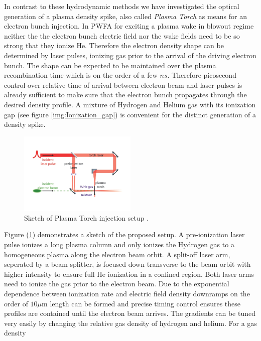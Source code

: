 In contrast to these hydrodynamic methods we have investigated the optical generation of a plasma density spike, also called \textit{Plasma Torch} \cite{PlaTo,PlaTo2} as means for an electron bunch injection.
In PWFA for exciting a plasma wake in blowout regime neither the the electron bunch electric field nor the wake fields need to be so strong that they ionize He. Therefore the electron density shape can be determined by laser pulses, ionizing gas prior to the arrival of the driving electron bunch. The shape can be expected to be maintained over the plasma recombination time which is on the order of a few $ns$. Therefore picosecond control over relative time of arrival between electron beam and laser pulses is already sufficient to make sure that the electron bunch propagates through the desired density profile. A mixture of Hydrogen and Helium gas with its ionization gap (see figure \ref{img:Ionization_gap}) is convenient for the distinct generation of a density spike. 
\begin{figure}[ht]
\begin{center}
\includegraphics[width=0.5\textwidth]{theory/images/edited/PlasmaTorchTheorySketch.pdf}
\end{center}
\caption{Sketch of Plasma Torch injection setup \cite{PlaTo2}.}
\label{img:Plato_FF_setup_theory}
\end{figure}
Figure (\ref{img:Plato_FF_setup_theory}) demonstrates a sketch of the proposed setup. 
A pre-ionization laser pulse ionizes a long plasma column and only ionizes the Hydrogen gas 
to a homogeneous plasma along the electron beam orbit.
A split-off laser arm, seperated by  a beam splitter, is focused down transverse to the beam orbit with higher intensity to ensure full He ionization in a confined region. Both laser arms need to ionize the gas prior to the electron beam.
Due to the exponential dependence between ionization rate and electric field density downramps on the order of $10 \mu\mathrm{m}$ length can be formed and precise timing control ensures these profiles are contained until the electron beam arrives. 
The gradients can be tuned very easily by changing the relative gas density of hydrogen and helium. For a gas density 

